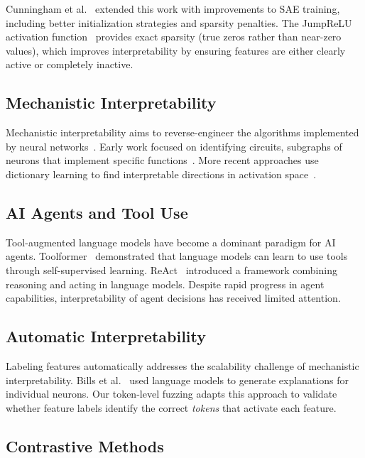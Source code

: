 \documentclass[runningheads]{llncs}
\begin{document}
Cunningham et al.~\cite{cunningham2023sparseautoencodershighlyinterpretable} extended this work with improvements to SAE training, including better initialization strategies and sparsity penalties. The JumpReLU activation function~\cite{ref_rajamanoharan2024} provides exact sparsity (true zeros rather than near-zero values), which improves interpretability by ensuring features are either clearly active or completely inactive.

\subsection{Mechanistic Interpretability}

Mechanistic interpretability aims to reverse-engineer the algorithms implemented by neural networks~\cite{ref_olah2020}. Early work focused on identifying circuits, subgraphs of neurons that implement specific functions~\cite{conmy2023automatedcircuitdiscoverymechanistic}. More recent approaches use dictionary learning to find interpretable directions in activation space~\cite{ref_sharkey2022}.

\subsection{AI Agents and Tool Use}

Tool-augmented language models have become a dominant paradigm for AI agents. Toolformer~\cite{schick2023toolformerlanguagemodelsteach} demonstrated that language models can learn to use tools through self-supervised learning. ReAct~\cite{yao2023reactsynergizingreasoningacting} introduced a framework combining reasoning and acting in language models. Despite rapid progress in agent capabilities, interpretability of agent decisions has received limited attention.

\subsection{Automatic Interpretability}

Labeling features automatically addresses the scalability challenge of mechanistic interpretability. Bills et al.~\cite{ref_bills2023} used language models to generate explanations for individual neurons. Our token-level fuzzing adapts this approach to validate whether feature labels identify the correct \emph{tokens} that activate each feature.

\subsection{Contrastive Methods}
\end{document}
